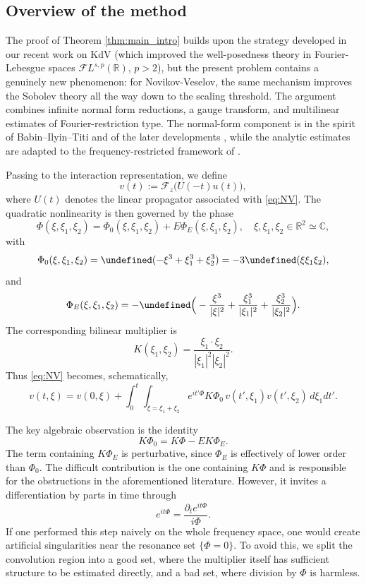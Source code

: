 \documentclass[a4paper,
11pt,  reqno]{amsart}
\newcommand{\5}{\textup{V}}
\newcommand{\FL}{\mathcal{F} L}
\newcommand{\F}{\mathcal{F}}
\theoremstyle{remark}
\newcommand{\R}{\mathbb{R}}
\newcommand{\CC}{\mathbb{C}}
\let\Re=\undefined\DeclareMathOperator*{\Re}{Re}
\numberwithin{equation}{section}
\numberwithin{theorem}{section}
\begin{document}
\subsection{Overview of the method}


The proof of Theorem \ref{thm:main_intro} builds upon the strategy developed in our recent
work on KdV \cite{chcora} (which improved the well-posedness theory in Fourier-Lebesgue spaces $\FL^{s,p}(\R)$, $p>2$), but the present problem contains a genuinely new phenomenon:
for Novikov-Veselov, the same mechanism improves the Sobolev theory all the way down to
the scaling threshold. The argument combines infinite normal form reductions, a gauge
transform, and multilinear estimates of Fourier-restriction type. The normal-form
component is in the spirit of Babin--Ilyin--Titi \cite{bit} and of the later developments
\cite{GKO13, KOY20, OW21, Kishimoto22}, while the analytic estimates are adapted to the
frequency-restricted framework of \cite{COS}.


Passing to the interaction representation, we define
\[
v(t):=\F_z\big(U(-t)u(t)\big),
\]
where $U(t)$ denotes the linear propagator associated with \eqref{eq:NV}. The quadratic
nonlinearity is then governed by the phase
\[
\Phi(\xi,\xi_1,\xi_2)=\Phi_0(\xi,\xi_1,\xi_2)+E\Phi_E(\xi,\xi_1,\xi_2),\quad \xi, \xi_1, \xi_2\in \R^2\simeq \CC,
\]
with
\[
\Phi_0(\xi,\xi_1,\xi_2)=\Re(-\xi^3+\xi_1^3+\xi_2^3)=-3\Re(\xi\xi_1\xi_2),
\]
and
\[
\Phi_E(\xi,\xi_1,\xi_2)
=-\Re\Big(-\frac{\xi^3}{|\xi|^2}+\frac{\xi_1^3}{|\xi_1|^2}+\frac{\xi_2^3}{|\xi_2|^2}\Big).
\]
The corresponding bilinear multiplier is
\[
K(\xi_1,\xi_2)=\frac{\xi_1\cdot\xi_2}{|\xi_1|^2|\xi_2|^2}.
\]
Thus \eqref{eq:NV} becomes, schematically,
\begin{equation}\label{eq:NV2}
	v(t,\xi)=v(0,\xi)+\int_0^t \int_{\xi=\xi_1+\xi_2} e^{it'\Phi}K\Phi_0\,v(t',\xi_1)v(t',\xi_2)\,d\xi_1dt'.
\end{equation}


The key algebraic observation is the identity
\[
K\Phi_0=K\Phi-EK\Phi_E.
\]
The term containing $K\Phi_E$ is perturbative, since $\Phi_E$ is effectively of lower
order than $\Phi_0$. The difficult contribution is the one containing $K\Phi$ and is responsible for the obstructions in the aforementioned literature. However, it
invites a differentiation by parts in time through
\[
e^{it\Phi}=\frac{\partial_t e^{it\Phi}}{i\Phi}.
\]
If one performed this step naively on the whole frequency space, one would create
artificial singularities near the resonance set $\{\Phi=0\}$. To avoid this, we split the
convolution region into a good set, where the multiplier itself has sufficient structure to be estimated directly, and a bad set, where division by $\Phi$ is harmless.
\end{document}
